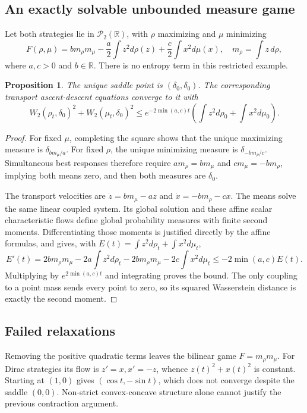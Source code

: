 \documentclass[11pt]{article}
\newtheorem{proposition}{Proposition}
\begin{document}
\subsection{An exactly solvable unbounded measure game}
Let both strategies lie in $\mathcal P_2(\mathbb R)$, with $\rho$ maximizing and $\mu$ minimizing
\[
 F(\rho,\mu)=b m_\rho m_\mu-\frac a2\int z^2d\rho(z)+\frac c2\int x^2d\mu(x),
 \quad m_\rho=\int z\,d\rho,
\]
where $a,c>0$ and $b\in\mathbb R$. There is no entropy term in this restricted example.
\begin{proposition}
The unique saddle point is $(\delta_0,\delta_0)$. The corresponding transport ascent-descent equations converge to it with
\[
 W_2(\rho_t,\delta_0)^2+W_2(\mu_t,\delta_0)^2
 \le e^{-2\min(a,c)t}\left(\int z^2d\rho_0+\int x^2d\mu_0\right).
\]
\end{proposition}
\begin{proof}
For fixed $\mu$, completing the square shows that the unique maximizing measure is $\delta_{bm_\mu/a}$. For fixed $\rho$, the unique minimizing measure is $\delta_{-bm_\rho/c}$. Simultaneous best responses therefore require $a m_\rho=b m_\mu$ and $c m_\mu=-b m_\rho$, implying both means zero, and then both measures are $\delta_0$.

The transport velocities are $\dot z=b m_\mu-a z$ and $\dot x=-b m_\rho-c x$. The means solve the same linear coupled system. Its global solution and these affine scalar characteristic flows define global probability measures with finite second moments. Differentiating those moments is justified directly by the affine formulas, and gives, with $E(t)=\int z^2d\rho_t+\int x^2d\mu_t$,
\[
 E'(t)=2b m_\rho m_\mu-2a\int z^2d\rho_t-2b m_\rho m_\mu-2c\int x^2d\mu_t
 \le-2\min(a,c)E(t).
\]
Multiplying by $e^{2\min(a,c)t}$ and integrating proves the bound. The only coupling to a point mass sends every point to zero, so its squared Wasserstein distance is exactly the second moment.
\end{proof}
\subsection{Failed relaxations}
Removing the positive quadratic terms leaves the bilinear game $F=m_\rho m_\mu$. For Dirac strategies its flow is $z'=x,x'=-z$, whence $z(t)^2+x(t)^2$ is constant. Starting at $(1,0)$ gives $(\cos t,-\sin t)$, which does not converge despite the saddle $(0,0)$. Non-strict convex-concave structure alone cannot justify the previous contraction argument.
\end{document}
